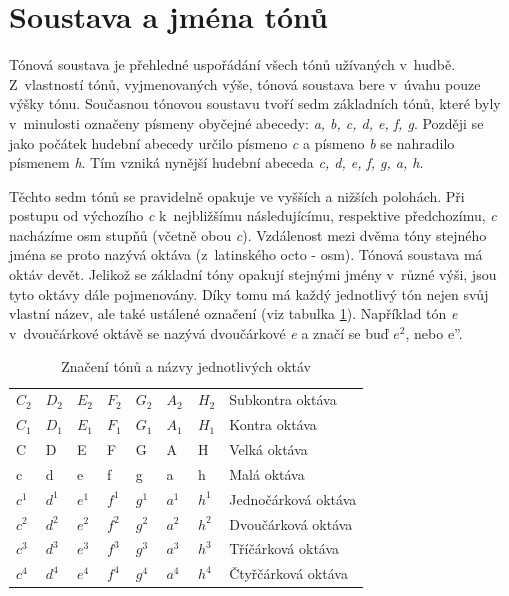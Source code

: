 \section{Soustava a jména tónů}
Tónová soustava je přehledné uspořádání všech tónů užívaných v~hudbě.
Z~vlastností tónů, vyjmenovaných výše, tónová soustava bere v~úvahu pouze výšky tónu. 
Současnou tónovou soustavu tvoří sedm základních tónů, které
byly v~minulosti označeny písmeny obyčejné abecedy: \emph{a, b, c, d, e, f, g}.
Později se jako počátek hudební abecedy určilo písmeno \emph{c} 
a písmeno \emph{b} se nahradilo písmenem \emph{h}.
Tím vzniká nynější hudební abeceda \emph{c, d, e, f, g, a, h}.
\par

Těchto sedm tónů se pravidelně opakuje ve vyšších a nižších polohách.
Při postupu od výchozího \emph{c} k~nejbližšímu následujícímu, respektive předchozímu, \emph{c} nacházíme osm stupňů 
(včetně obou \emph{c}).
Vzdálenost mezi dvěma tóny stejného jména se proto nazývá oktáva (z~latinského octo - osm).
Tónová soustava má oktáv devět.
Jelikož se základní tóny opakují stejnými jmény v~různé výši,
jsou tyto oktávy dále pojmenovány.
Díky tomu má každý jednotlivý tón nejen svůj vlastní název,
ale také ustálené označení (viz tabulka \ref{tabulkaOktav}).
Například tón \emph{e} v~dvoučárkové oktávě se nazývá dvoučárkové \emph{e}
a značí se buď $e^2$, nebo{ e''}.
\cite{zenkl,cmiral}
\par

\begin{table}[]
    \begin{tabular}{ l l l l l l l | l }
        $C_2$ & $D_2$ & $E_2$ & $F_2$ & $G_2$ & $A_2$ & $H_2$ & Subkontra oktáva    \\
        $C_1$ & $D_1$ & $E_1$ & $F_1$ & $G_1$ & $A_1$ & $H_1$ & Kontra oktáva       \\
        C     & D     & E     & F     & G     & A~& H     & Velká oktáva        \\
        c     & d     & e     & f     & g     & a     & h     & Malá oktáva         \\
        $c^1$ & $d^1$ & $e^1$ & $f^1$ & $g^1$ & $a^1$ & $h^1$ & Jednočárková oktáva \\
        $c^2$ & $d^2$ & $e^2$ & $f^2$ & $g^2$ & $a^2$ & $h^2$ & Dvoučárková oktáva  \\
        $c^3$ & $d^3$ & $e^3$ & $f^3$ & $g^3$ & $a^3$ & $h^3$ & Tříčárková oktáva   \\
        $c^4$ & $d^4$ & $e^4$ & $f^4$ & $g^4$ & $a^4$ & $h^4$ & Čtyřčárková oktáva  \\
    \end{tabular}
    \caption{Značení tónů a názvy jednotlivých oktáv}
    \label{tabulkaOktav}
\end{table}

